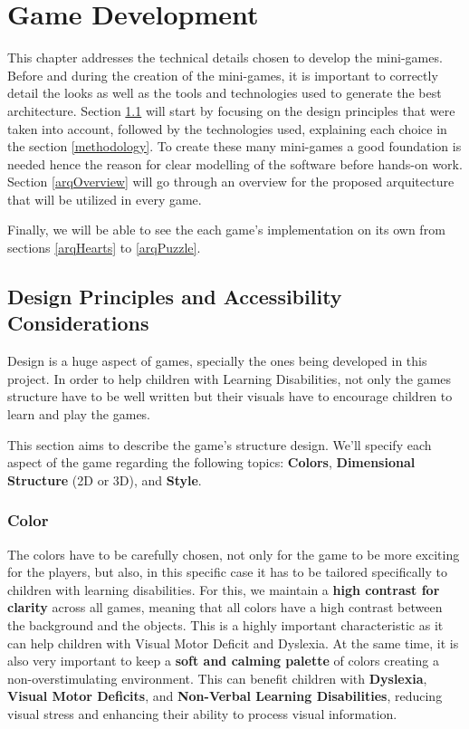 \raggedbottom

\chapter{Game Development}
\label{cha:game_development}

This chapter addresses the technical details chosen to develop the mini-games. Before and during the creation of the mini-games, it is important to correctly detail the looks as well as the tools and technologies used to generate the best architecture.
Section \ref{designPriciples} will start by focusing on the design principles that were taken into account, followed by the technologies used, explaining each choice in the section \ref{methodology}. 
To create these many mini-games a good foundation is needed hence the reason for clear modelling of the software before hands-on work. Section \ref{arqOverview} will go through an overview for the proposed arquitecture that will be utilized in every game.

Finally, we will be able to see the each game's implementation on its own from sections \ref{arqHearts} to \ref{arqPuzzle}.

\newpage
\section{Design Principles and Accessibility Considerations}
\label{designPriciples}

Design is a huge aspect of games, specially the ones being developed in this project. In order to help children with Learning Disabilities, not only the games structure have to be well written but their visuals have to encourage children to learn and play the games.

This section aims to describe the game's structure design. We'll specify each aspect of the game regarding the following topics: \textbf{Colors}, \textbf{Dimensional Structure} (2D or 3D), and \textbf{Style}.

\subsection*{Color}
The colors have to be carefully chosen, not only for the game to be more exciting for the players, but also, in this specific case it has to be tailored specifically to children with learning disabilities.
For this, we maintain a \textbf{high contrast for clarity} across all games, meaning that all colors have a high contrast between the background and the objects. This is a highly important characteristic as it can help children with Visual Motor Deficit and Dyslexia.
At the same time, it is also very important to keep a \textbf{soft and calming palette} of colors creating a non-overstimulating environment. This can benefit children with \textbf{Dyslexia}, \textbf{Visual Motor Deficits}, and \textbf{Non-Verbal Learning Disabilities}, reducing visual stress and enhancing their ability to process visual information.


